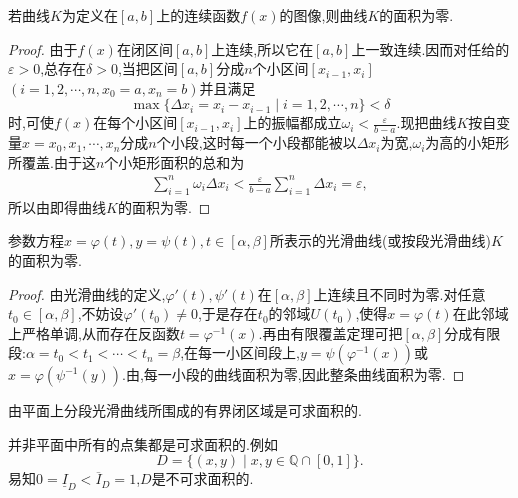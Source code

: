 \documentclass[../../main.tex]{subfiles}%
\begin{document}
\begin{theorem}\label{theorem:数分--定理21.3}
若曲线$K$为定义在$[a,b]$上的连续函数$f(x)$的图像,则曲线$K$的面积为零.
\end{theorem}
\begin{proof}

由于$f(x)$在闭区间$[a,b]$上连续,所以它在$[a,b]$上一致连续.因而对任给的$\varepsilon > 0$,总存在$\delta > 0$,当把区间$[a,b]$分成$n$个小区间$[x_{i-1},x_i]$ $(i = 1,2,\cdots,n,x_0 = a,x_n = b)$并且满足
\[
\max\{ \Delta x_i = x_i - x_{i-1} \mid i = 1,2,\cdots,n \} < \delta
\]
时,可使$f(x)$在每个小区间$[x_{i-1},x_i]$上的振幅都成立$\omega_i < \frac{\varepsilon}{b - a}$.现把曲线$K$按自变量$x = x_0,x_1,\cdots,x_n$分成$n$个小段,这时每一个小段都能被以$\Delta x_i$为宽,$\omega_i$为高的小矩形所覆盖.由于这$n$个小矩形面积的总和为
\begin{align*}
\sum_{i=1}^n \omega_i \Delta x_i < \frac{\varepsilon}{b - a} \sum_{i=1}^n \Delta x_i = \varepsilon,
\end{align*}
所以由即得曲线$K$的面积为零.

\end{proof}

\begin{corollary}
参数方程$x = \varphi(t),y = \psi(t),t \in [\alpha,\beta]$所表示的光滑曲线(或按段光滑曲线)$K$的面积为零.
\end{corollary}
\begin{proof}

由光滑曲线的定义,$\varphi'(t),\psi'(t)$在$[\alpha,\beta]$上连续且不同时为零.对任意$t_0 \in [\alpha,\beta]$,不妨设$\varphi'(t_0) \neq 0$,于是存在$t_0$的邻域$U(t_0)$,使得$x = \varphi(t)$在此邻域上严格单调,从而存在反函数$t = \varphi^{-1}(x)$.再由有限覆盖定理可把$[\alpha,\beta]$分成有限段:$\alpha = t_0 < t_1 < \cdots < t_n = \beta$,在每一小区间段上,$y = \psi(\varphi^{-1}(x))$或$x = \varphi(\psi^{-1}(y))$.由,每一小段的曲线面积为零,因此整条曲线面积为零.

\end{proof}

\begin{corollary}
由平面上分段光滑曲线所围成的有界闭区域是可求面积的.
\end{corollary}
\begin{remark}
并非平面中所有的点集都是可求面积的.例如
\[
D = \{ (x,y) \mid x,y \in \mathbb{Q} \cap [0,1] \}.
\]
易知$0 = \underline{I}_D < \overline{I}_D = 1$,$D$是不可求面积的.
\end{remark}
\end{document}
